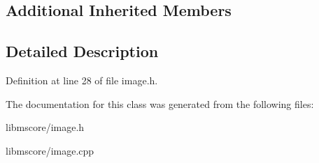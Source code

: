 \subsection*{Additional Inherited Members}


\subsection{Detailed Description}


Definition at line 28 of file image.\+h.



The documentation for this class was generated from the following files\+:\begin{DoxyCompactItemize}
\item 
libmscore/image.\+h\item 
libmscore/image.\+cpp\end{DoxyCompactItemize}
